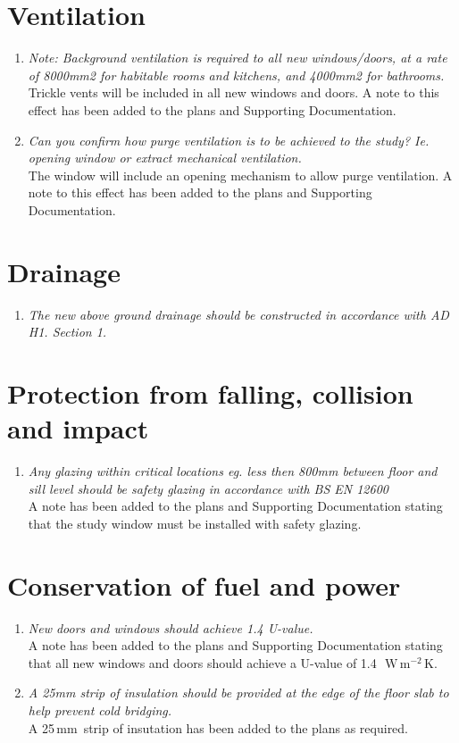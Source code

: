 \documentclass{extension}
\newcommand{\mm}{\,$\mathrm{mm}$}
\newcommand{\uunit}{\,$\mathrm{W\,m^{-2}\,K}$}
\begin{document}
\section{Ventilation}
\begin{enumerate}
\item {\it Note: Background ventilation is required to all new windows/doors, at a rate of 8000mm2 for habitable rooms and kitchens, and 4000mm2 for bathrooms.}\\
Trickle vents will be included in all new windows and doors. A note to this effect has been added to the plans and Supporting Documentation.
\item {\it Can you confirm how purge ventilation is to be achieved to the study? Ie. opening window or extract mechanical ventilation.}\\
The window will include an opening mechanism to allow purge ventilation. A note to this effect has been added to the plans and Supporting Documentation.
\end{enumerate}

\section{Drainage}
\begin{enumerate}
\item {\it The new above ground drainage should be constructed in accordance with AD H1. Section 1.}
\end{enumerate}

\section{Protection from falling, collision and impact}
\begin{enumerate}
\item {\it Any glazing within critical locations eg. less then 800mm between floor and sill level should be safety glazing in accordance with BS EN 12600}\\
A note has been added to the plans and Supporting Documentation stating that the study window must be installed with safety glazing.
\end{enumerate}

\section{Conservation of fuel and power}
\begin{enumerate}
\item {\it New doors and windows should achieve 1.4 U-value.}\\
A note has been added to the plans and Supporting Documentation stating that all new windows and doors should achieve a U-value of 1.4~\uunit .
\item {\it A 25mm strip of insulation should be provided at the edge of the floor slab to help prevent cold bridging.}\\
A 25\mm\ strip of insutation has been added to the plans as required.
\end{enumerate}
\end{document}

